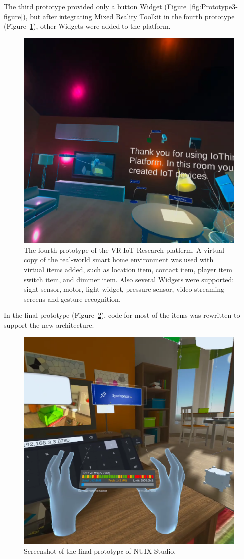 The third prototype provided only a button Widget (Figure~\ref{fig:Prototype3-figure}), but after integrating Mixed Reality Toolkit in the fourth prototype (Figure~\ref{fig:Prototype4-figure}), other Widgets were added to the platform.

\begin{figure}
  \centering
  \includegraphics[width=0.6\linewidth]{figures/Prototype4.png}
  \caption{The fourth prototype of the VR-IoT Research platform. A virtual copy of the real-world smart home environment was used with virtual items added, such as location item, contact item, player item switch item, and dimmer item. Also several Widgets were supported: sight sensor, motor, light widget, pressure sensor, video streaming screens and gesture recognition.}
  \label{fig:Prototype4-figure}
\end{figure}

In the final prototype (Figure~\ref{fig:FinalPrototype-figure}), code for most of the items was rewritten to support the new architecture. 

\begin{figure}
  \centering
  \includegraphics[width=0.6\linewidth]{figures/FinalPrototype.png}
  \caption{Screenshot of the final prototype of NUIX-Studio.}
  \label{fig:FinalPrototype-figure}
\end{figure}